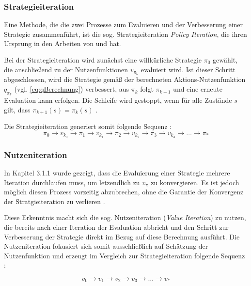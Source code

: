 \subsubsection{Strategieiteration}
Eine Methode, die die zwei Prozesse zum Evaluieren und der Verbesserung einer Strategie zusammenführt, ist die sog. Strategieiteration \textit{Policy Iteration}, die ihren Ursprung in den Arbeiten von \cite{bellman1957dynamic} und \cite{howard1960dynamic} hat. 
\par 
Bei der Strategieiteration wird zunächst eine willkürliche Strategie $\pi_0$ gewählt, die anschließend zu der Nutzenfunktionen $v_{\pi_k}$ evaluiert wird. Ist dieser Schritt abgeschlossen, wird die Strategie gemäß der berechneten Aktions-Nutzenfunktion $q_{\pi_k}$ (vgl. \ref{eq:qBerechnung}) verbessert, aus $\pi_k$ folgt $\pi_{k+1}$ und eine erneute Evaluation kann erfolgen. Die Schleife wird gestoppt, wenn für alle Zustände $s$ gilt, dass $\pi_{k+1}(s) = \pi_k(s)$ \cite[S.~22]{Wiering}. 
\par 
Die Strategieiteration generiert somit folgende Sequenz \cite[S.~22]{Wiering}:
\begin{equation}\label{eq:policyItSeq}
\pi_0 \rightarrow v_{k_0} \rightarrow  \pi_1 \rightarrow v_{k_1} \rightarrow  \pi_2 \rightarrow v_{k_2}\rightarrow  \pi_3 \rightarrow v_{k_3}\rightarrow \dots \rightarrow \pi_*
\end{equation}

\subsubsection{Nutzeniteration}
In Kapitel 3.1.1 wurde gezeigt, dass die Evaluierung einer Strategie mehrere Iteration durchlaufen muss, um letzendlich zu $v_\pi$ zu konvergieren. Es ist jedoch möglich diesen Prozess vorzeitig abzubrechen, \glqq ohne die Garantie der Konvergenz der Stratgieiteration zu verlieren\grqq{} \cite[S.~82]{Sutton1998}. 
\par 
Diese Erkenntnis macht sich die sog. Nutzeniteration (\textit{Value Iteration}) zu nutzen, die bereits nach einer Iteration der Evaluation abbricht und den Schritt zur Verbesserung der Strategie direkt im Bezug auf diese Berechnung ausführt. Die Nutzeniteration fokusiert sich somit ausschließlich auf Schätzung der Nutzenfunktion und erzeugt im Vergleich zur Strategieiteration folgende Sequenz \cite[S.~23]{Wiering}:

\begin{equation}\label{eq:valueItSeq}
    v_0 \rightarrow v_1 \rightarrow v_2 \rightarrow v_3 \rightarrow \dots \rightarrow v_*
\end{equation}

